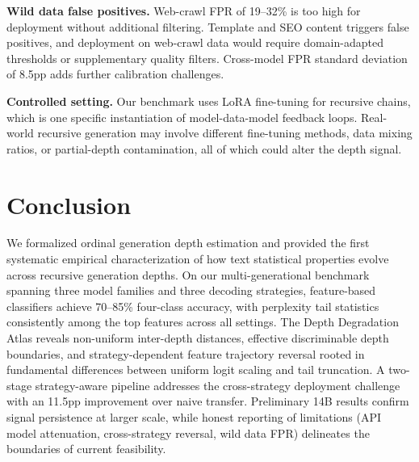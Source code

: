\documentclass[11pt,a4paper]{article}
\begin{document}
\textbf{Wild data false positives.} Web-crawl FPR of 19--32\% is too high for deployment without additional filtering. Template and SEO content triggers false positives, and deployment on web-crawl data would require domain-adapted thresholds or supplementary quality filters. Cross-model FPR standard deviation of 8.5pp adds further calibration challenges.

\textbf{Controlled setting.} Our benchmark uses LoRA fine-tuning for recursive chains, which is one specific instantiation of model-data-model feedback loops. Real-world recursive generation may involve different fine-tuning methods, data mixing ratios, or partial-depth contamination, all of which could alter the depth signal.

\section{Conclusion}

We formalized ordinal generation depth estimation and provided the first systematic empirical characterization of how text statistical properties evolve across recursive generation depths. On our multi-generational benchmark spanning three model families and three decoding strategies, feature-based classifiers achieve 70--85\% four-class accuracy, with perplexity tail statistics consistently among the top features across all settings. The Depth Degradation Atlas reveals non-uniform inter-depth distances, effective discriminable depth boundaries, and strategy-dependent feature trajectory reversal rooted in fundamental differences between uniform logit scaling and tail truncation. A two-stage strategy-aware pipeline addresses the cross-strategy deployment challenge with an 11.5pp improvement over naive transfer. Preliminary 14B results confirm signal persistence at larger scale, while honest reporting of limitations (API model attenuation, cross-strategy reversal, wild data FPR) delineates the boundaries of current feasibility.


\end{document}
